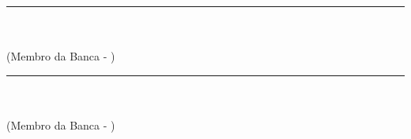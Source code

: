 \begin{folhadeaprovacao}
\begin{flushleft}
		
		\vspace*{1.45cm} %
		\rule{9 cm}{.1 mm}\\
		\imprimirtitulacaoexamum{ }\imprimirnmexamum\\
		(Membro da Banca - \imprimirinstexamum)
		
		\vspace*{1.45cm} %
		\rule{9 cm}{.1 mm}\\
		\imprimirtitulacaoexamdois{ }\imprimirnmexamum\\
		(Membro da Banca - \imprimirinstexamdois)
		\vspace*{1.6cm} %
	\end{flushleft}

	\begin{center} %
		\normalsize %
		\setlength{\baselineskip}{1.2\baselineskip}
		\textbf{\imprimirlocal}\\
		\textbf{\imprimirdata}
	\end{center} %
	
\end{folhadeaprovacao}
\makeatother
